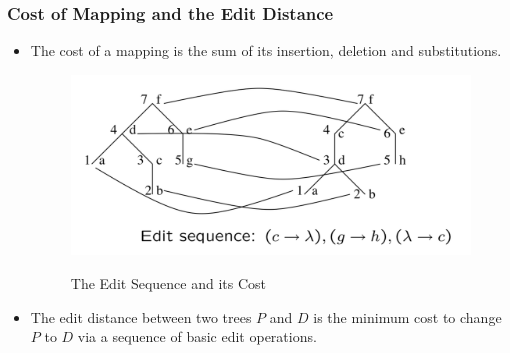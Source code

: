 \documentclass{beamer}
\begin{document}
\begin{frame}
\frametitle{Cost of Mapping and the Edit Distance}
\begin{itemize}
\item The cost of a mapping is the sum of its insertion, deletion and substitutions.
\begin{figure}
	\includegraphics[width=0.7\linewidth]{EditDistance}
	\label{Edit Sequence} 
	\caption{The Edit Sequence and its Cost}
	\centering
\end{figure}
\item The edit distance between two trees  $P$  and $D$  is the minimum cost to change $P $ to $D$  via a sequence of basic edit operations.
\end{itemize}
\end{frame}
\end{document}
